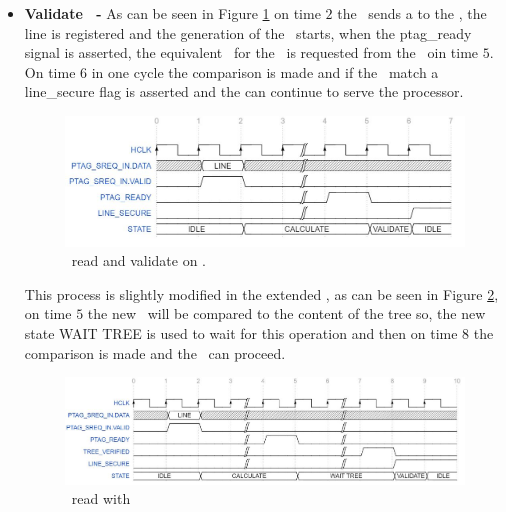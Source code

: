 \begin{itemize}
 \item{\textbf{Validate \ptag~- }} As can be seen in Figure \ref{fig:ptgag_rd_no_mt}  on time $2$ the \handler~sends a  \sline to the \seceng, the line is registered and the generation of the \ptag~starts, when the ptag\_ready signal is asserted,  the equivalent \ptag~for the \sline~is requested from the \ptagmem~oin time $5$. On time $6$ in one cycle the comparison is made and if the \ptags~match a line\_secure flag is asserted and the \handler can continue to serve the processor.
 
   \begin{figure}[!ht]
    \centering
    \includegraphics[width=\textwidth]{figures/others/ptag_read_sec_eng.JPG}
    \caption{\ptag~read and validate on \seceng.}
    \label{fig:ptgag_rd_no_mt}
\end{figure}
This process is slightly modified  in the extended \cshia, as can be seen in Figure  \ref{fig:ptgag_rd_mt}, on time $5$  the new \ptag~will be compared to the content of the tree so, the new state WAIT TREE  is used to wait for this  operation and then  on time $8$ the comparison is made and the \seceng~can proceed.   
\begin{figure}[!ht]
    \centering
    \includegraphics[width=\textwidth]{figures/others/ptag_read_tree_sec_eng.JPG}
    \caption{\ptag~read with \mt }
    \label{fig:ptgag_rd_mt}
\end{figure}


\end{itemize}
